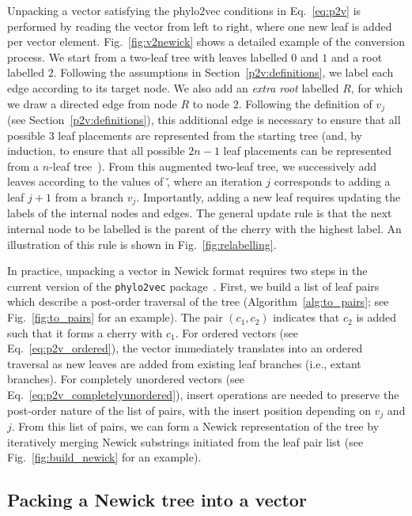 Unpacking a vector satisfying the phylo2vec conditions in Eq.~\ref{eq:p2v} is performed by reading the vector from left to right, where one new leaf is added per vector element. Fig.~\ref{fig:v2newick} shows a detailed example of the conversion process. We start from a two-leaf tree with leaves labelled $0$ and $1$ and a root labelled $2$. Following the assumptions in Section~\ref{p2v:definitions}, we label each edge according to its target node. We also add an \emph{extra root} labelled $R$, for which we draw a directed edge from node $R$ to node $2$. Following the definition of $v_j$ (see Section~\ref{p2v:definitions}), this additional edge is necessary to ensure that all possible $3$ leaf placements are represented from the starting tree (and, by induction, to ensure that all possible $2n-1$ leaf placements can be represented from a $n$-leaf tree~\cite{cavallisforza1967}). From this augmented two-leaf tree, we successively add leaves according to the values of \v, where an iteration $j$ corresponds to adding a leaf $j+1$ from a branch $v_j$. Importantly, adding a new leaf requires updating the labels of the internal nodes and edges. The general update rule is that the next internal node to be labelled is the parent of the cherry with the highest label. An illustration of this rule is shown in Fig.~\ref{fig:relabelling}.



In practice, unpacking a vector in Newick format requires two steps in the current version of the \texttt{phylo2vec} package~\cite{scheidwasser2025}. First, we build a list of leaf pairs which describe a post-order traversal of the tree (Algorithm~\ref{alg:to_pairs}; see Fig.~\ref{fig:to_pairs} for an example). The pair $(c_1, c_2)$ indicates that $c_2$ is added such that it forms a cherry with $c_1$. For ordered vectors (see Eq.~\ref{eq:p2v_ordered}), the vector immediately translates into an ordered traversal as new leaves are added from existing leaf branches (i.e., extant branches). For completely unordered vectors (see Eq.~\ref{eq:p2v_completelyunordered}), insert operations are needed to preserve the post-order nature of the list of pairs, with the insert position depending on $v_j$ and $j$. From this list of pairs, we can form a Newick representation of the tree by iteratively merging Newick substrings initiated from the leaf pair list (see Fig.~\ref{fig:build_newick} for an example).





\subsection{Packing a Newick tree into a vector}
\label{methods:newick2v}

